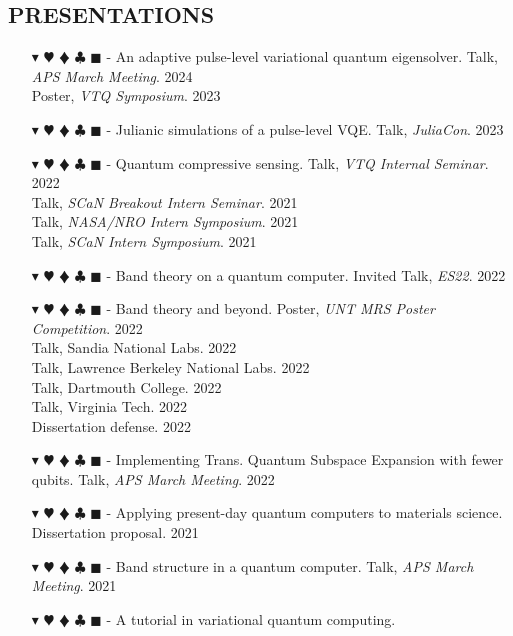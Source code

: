 \documentclass[overlapped, 10pt]{res} %
\newcommand{\physics}{$\blacktriangledown$}
\newcommand{\biochem}{$\varheartsuit$}
\newcommand{\shannon}{$\vardiamondsuit$}
\newcommand{\classic}{$\clubsuit$}
\newcommand{\quantum}{$\blacksquare$}
\newcommand{\physicscolor}{\color{YellowOrange}}
\newcommand{\biochemcolor}{\color{Emerald}}
\newcommand{\shannoncolor}{\color{Goldenrod}}
\newcommand{\classiccolor}{\color{Cyan}}
\newcommand{\quantumcolor}{\color{RedOrange}}
\newcommand{\tag}[1]{
    {\IfSubStr{#1}{\physics}{\physicscolor}{\color{White}}\physics}
    {\IfSubStr{#1}{\biochem}{\biochemcolor}{\color{White}}\biochem}
    {\IfSubStr{#1}{\shannon}{\shannoncolor}{\color{White}}\shannon}
    {\IfSubStr{#1}{\classic}{\classiccolor}{\color{White}}\classic}
    {\IfSubStr{#1}{\quantum}{\quantumcolor}{\color{White}}\quantum}
}
\begin{document}
\begin{resume}
\section{PRESENTATIONS}
\begin{itemize} \itemsep -2pt %
\item[\tag{\physics\biochem\shannon\quantum}-] An adaptive pulse-level variational quantum eigensolver.
    \hfill Talk, \textit{APS March Meeting}. 2024
    \\ \null \hfill Poster, \textit{VTQ Symposium}. 2023
\item[\tag{\physics\biochem\classic\quantum}-] Julianic simulations of a pulse-level VQE.
    \hfill Talk, \textit{JuliaCon}. 2023
\item[\tag{\shannon\quantum}-] Quantum compressive sensing.
    \hfill Talk, \textit{VTQ Internal Seminar}. 2022
    \\ \null \hfill Talk, \textit{SCaN Breakout Intern Seminar}. 2021
    \\ \null \hfill Talk, \textit{NASA/NRO Intern Symposium}. 2021
    \\ \null \hfill Talk, \textit{SCaN Intern Symposium}. 2021
\item[\tag{\physics\quantum}-] Band theory on a quantum computer.
    \hfill Invited Talk, \textit{ES22}. 2022
\item[\tag{\physics\biochem\shannon\quantum}-] Band theory and beyond.
    \hfill Poster, \textit{UNT MRS Poster Competition}. 2022
    \\ \null \hfill Talk, Sandia National Labs. 2022
    \\ \null \hfill Talk, Lawrence Berkeley National Labs. 2022
    \\ \null \hfill Talk, Dartmouth College. 2022
    \\ \null \hfill Talk, Virginia Tech. 2022
    \\ \null \hfill Dissertation defense. 2022
\item[\tag{\physics\quantum}-] Implementing Trans. Quantum Subspace Expansion with fewer qubits.
    \hfill Talk, \textit{APS March Meeting}. 2022
\item[\tag{\physics\biochem\quantum}-] Applying present-day quantum computers to materials science.
    \hfill Dissertation proposal. 2021
\item[\tag{\physics\quantum}-] Band structure in a quantum computer.
    \hfill Talk, \textit{APS March Meeting}. 2021
\item[\tag{\physics\quantum}-] A tutorial in variational quantum computing.

\end{itemize}
\end{resume}
\end{document}
